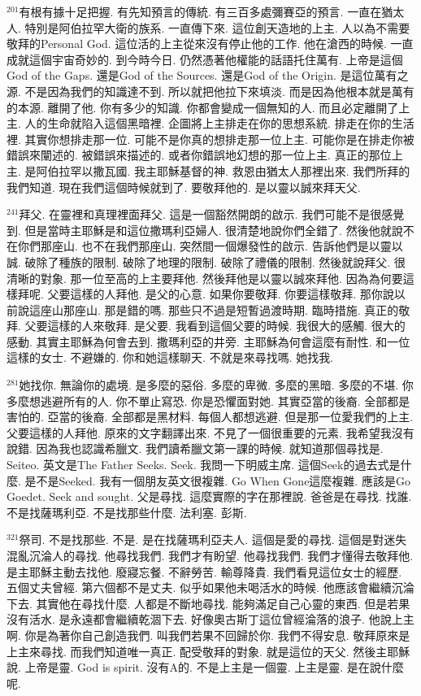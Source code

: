 \documentclass{book}
\begin{document}
$^{201}$有根有據十足把握.
有先知預言的傳統.
有三百多處彌賽亞的預言.
一直在猶太人.
特別是阿伯拉罕大衛的族系.
一直傳下來.
這位創天造地的上主.
人以為不需要敬拜的Personal God.
這位活的上主從來沒有停止他的工作.
他在滄西的時候.
一直成就這個宇宙奇妙的.
到今時今日.
仍然憑著他權能的話語托住萬有.
上帝是這個God of the Gaps.
還是God of the Sources.
還是God of the Origin.
是這位萬有之源.
不是因為我們的知識達不到.
所以就把他拉下來填淡.
而是因為他根本就是萬有的本源.
離開了他.
你有多少的知識.
你都會變成一個無知的人.
而且必定離開了上主.
人的生命就陷入這個黑暗裡.
企圖將上主排走在你的思想系統.
排走在你的生活裡.
其實你想排走那一位.
可能不是你真的想排走那一位上主.
可能你是在排走你被錯誤來闡述的.
被錯誤來描述的.
或者你錯誤地幻想的那一位上主.
真正的那位上主.
是阿伯拉罕以撒瓦國.
我主耶穌基督的神.
救恩由猶太人那裡出來.
我們所拜的我們知道.
現在我們這個時候就到了.
要敬拜他的.
是以靈以誠來拜天父.

$^{241}$拜父.
在靈裡和真理裡面拜父.
這是一個豁然開朗的啟示.
我們可能不是很感覺到.
但是當時主耶穌是和這位撒瑪利亞婦人.
很清楚地說你們全錯了.
然後他就說不在你們那座山.
也不在我們那座山.
突然間一個爆發性的啟示.
告訴他們是以靈以誠.
破除了種族的限制.
破除了地理的限制.
破除了禮儀的限制.
然後就說拜父.
很清晰的對象.
那一位至高的上主要拜他.
然後拜他是以靈以誠來拜他.
因為為何要這樣拜呢.
父要這樣的人拜他.
是父的心意.
如果你要敬拜.
你要這樣敬拜.
那你說以前說這座山那座山.
那是錯的嗎.
那些只不過是短暫過渡時期.
臨時措施.
真正的敬拜.
父要這樣的人來敬拜.
是父要.
我看到這個父要的時候.
我很大的感觸.
很大的感動.
其實主耶穌為何會去到.
撒瑪利亞的井旁.
主耶穌為何會這麼有耐性.
和一位這樣的女士.
不避嫌的.
你和她這樣聊天.
不就是來尋找嗎.
她找我.

$^{281}$她找你.
無論你的處境.
是多麼的惡俗.
多麼的卑微.
多麼的黑暗.
多麼的不堪.
你多麼想逃避所有的人.
你不單止寫恐.
你是恐懼面對她.
其實亞當的後裔.
全部都是害怕的.
亞當的後裔.
全部都是黑材料.
每個人都想逃避.
但是那一位愛我們的上主.
父要這樣的人拜他.
原來的文字翻譯出來.
不見了一個很重要的元素.
我希望我沒有說錯.
因為我也認識希臘文.
我們讀希臘文第一課的時候.
就知道那個尋找是.
Seiteo.
英文是The Father Seeks.
Seek.
我問一下明威主席.
這個Seek的過去式是什麼.
是不是Seeked.
我有一個朋友英文很複雜.
Go When Gone這麼複雜.
應該是Go Goedet.
Seek and sought.
父是尋找.
這麼實際的字在那裡說.
爸爸是在尋找.
找誰.
不是找薩瑪利亞.
不是找那些什麼.
法利塞.
彭斯.

$^{321}$祭司.
不是找那些.
不是.
是在找薩瑪利亞夫人.
這個是愛的尋找.
這個是對迷失混亂沉淪人的尋找.
他尋找我們.
我們才有盼望.
他尋找我們.
我們才懂得去敬拜他.
是主耶穌主動去找他.
廢寢忘餐.
不辭勞苦.
輸尊降貴.
我們看見這位女士的經歷.
五個丈夫曾經.
第六個都不是丈夫.
似乎如果他未喝活水的時候.
他應該會繼續沉淪下去.
其實他在尋找什麼.
人都是不斷地尋找.
能夠滿足自己心靈的東西.
但是若果沒有活水.
是永遠都會繼續乾涸下去.
好像奧古斯丁這位曾經淪落的浪子.
他說上主啊.
你是為著你自己創造我們.
叫我們若果不回歸於你.
我們不得安息.
敬拜原來是上主來尋找.
而我們知道唯一真正.
配受敬拜的對象.
就是這位的天父.
然後主耶穌說.
上帝是靈.
God is spirit.
沒有A的.
不是上主是一個靈.
上主是靈.
是在說什麼呢.
\end{document}
